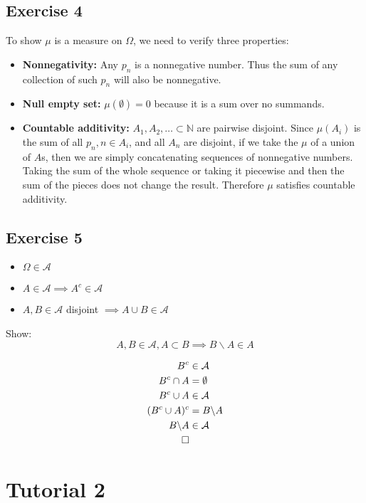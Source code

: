 \documentclass{article}
\begin{document}
\subsection*{Exercise 4}

To show $\mu$ is a measure on $\Omega$, we need to verify three properties:
\begin{itemize}
    \item \textbf{Nonnegativity:} Any $p_n$ is a nonnegative number. Thus the sum of any collection of such $p_n$ will also be nonnegative.
    \item \textbf{Null empty set:} $\mu(\emptyset) = 0$ because it is a sum over no summands.
    \item \textbf{Countable additivity:} $A_1, A_2, \dots \subset \mathbb{N}$ are pairwise disjoint. Since $\mu(A_i)$ is the sum of all $p_n, n \in A_i$, and all $A_n$ are disjoint, if we take the $\mu$ of a union of $A$s, then we are simply concatenating sequences of nonnegative numbers. Taking the sum of the whole sequence or taking it piecewise and then the sum of the pieces does not change the result. Therefore $\mu$ satisfies countable additivity.
\end{itemize}

\subsection*{Exercise 5}
\begin{itemize}
    \item $\Omega \in \mathcal{A}$
    \item $A \in \mathcal{A} \implies A^c \in \mathcal{A}$
    \item $A, B \in \mathcal{A}$ disjoint $\implies A \cup B \in \mathcal{A}$
\end{itemize}
Show:
\[
    A, B \in \mathcal{A}, A \subset B \implies B \backslash A \in A
\]

\begin{align*}
    B^c &\in \mathcal{A} \\
    B^c \cap A &= \emptyset \\
    B^c \cup A &\in \mathcal{A} \\
    (B^c \cup A)^c &= B \backslash A \\
    B \backslash A &\in \mathcal{A} \\
    \qed
\end{align*}

\section*{Tutorial 2}
\end{document}
